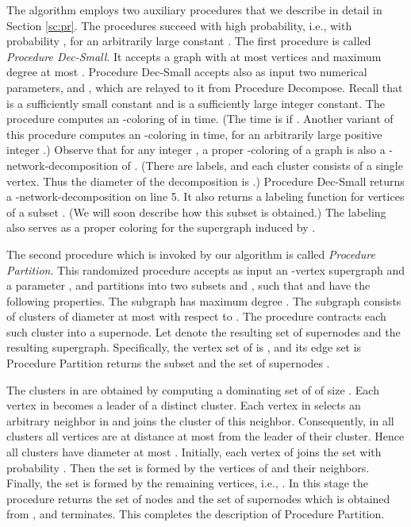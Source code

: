 \documentclass[11pt]{article}
\begin{document}
The algorithm employs two auxiliary procedures that we describe in detail in Section \ref{sc:pr}. The procedures succeed with high probability, i.e., with probability , for an arbitrarily large constant . The first procedure is called {\em Procedure Dec-Small}. It accepts a graph  with at most  vertices and maximum degree at most . Procedure Dec-Small accepts also as input two numerical parameters,  and , which are relayed to it from Procedure Decompose. Recall that  is a sufficiently small constant and  is a sufficiently large integer constant. The procedure computes an -coloring of  in  time. (The time is  if . Another variant of this procedure computes an -coloring in  time, for an arbitrarily large positive integer .) Observe that for any integer , a proper -coloring of a graph  is also a -network-decomposition of . (There are  labels, and each cluster consists of a single vertex. Thus the diameter of the decomposition is .)  Procedure Dec-Small returns a -network-decomposition  on line 5. It also returns a labeling function  for vertices of a subset . (We will soon describe how this subset is obtained.)  The labeling  also serves as a proper coloring for the supergraph induced by . 

The second procedure which is invoked by our algorithm is called {\em Procedure Partition}. This randomized procedure accepts as input an -vertex supergraph  and a parameter , and partitions  into two subsets  and , such that  and  have the following properties. The subgraph  has maximum degree . The subgraph  consists of  clusters of diameter at most  with respect to . The procedure contracts each such cluster into a supernode. Let  denote the resulting set of supernodes and  the resulting supergraph. Specifically, the vertex set of  is , and its edge set is    Procedure Partition returns the subset  and the set of supernodes .

 The clusters in  are obtained by computing a dominating set  of  of size . Each vertex in  becomes a leader of a distinct cluster. Each vertex in  selects an arbitrary neighbor in  and joins the cluster of this neighbor. Consequently, in all clusters all vertices are at distance at most  from the leader of their cluster. Hence all clusters have diameter at most . 
Initially, each vertex of  joins the set  with probability . Then the set  is formed by the vertices of  and their neighbors. Finally, the set  is formed by the remaining vertices, i.e., . In this stage the procedure returns the set of nodes  and the set of supernodes  which is obtained from , and terminates. This completes the description of Procedure Partition.
\end{document}
